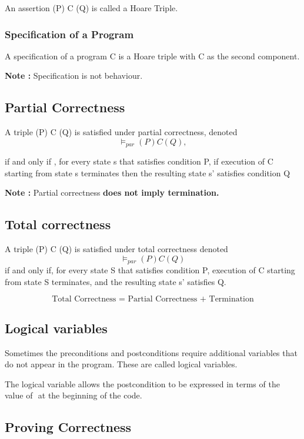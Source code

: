 \documentclass{article}
\begin{document}
An assertion (P) C (Q) is called a Hoare Triple. 

\subsubsection{Specification of a Program}

A specification of a program C is a Hoare triple with C as the second component. 

\textbf{Note : } Specification is not behaviour. 

\subsection{Partial Correctness}
A triple (P) C (Q) is satisfied under partial correctness, denoted 
$$ \models_{par} (P) C (Q), $$

if and only if , for every state s that satisfies condition P, if execution of C starting from state s terminates then the resulting state s' satisfies condition Q

\textbf{Note : } Partial correctness \textbf{does not imply termination.}

\subsection{Total correctness}
A triple (P) C (Q) is satisfied under total correctness denoted 
$$ \models_{par} (P) C (Q) $$
if and only if, for every state S that satisfies condition P, execution of C starting from state S terminates, and the resulting state s' satisfies Q.

$$\text{Total Correctness  = Partial Correctness + Termination}$$

\subsection{Logical variables}

Sometimes the preconditions and postconditions require additional
variables that do not appear in the program.
These are called logical variables.

The logical variable allows the postcondition to be expressed in
terms of the value of  at the beginning of the code.

\subsection{Proving Correctness}
\end{document}
